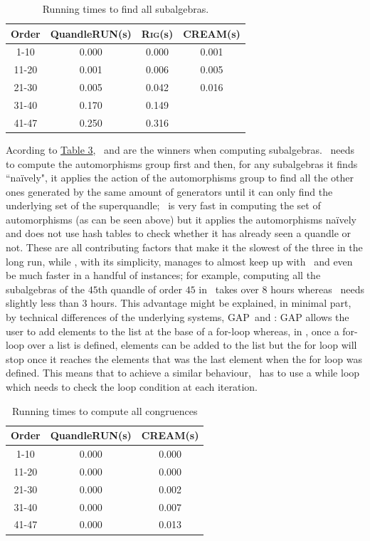 \documentclass{mcom-l}
\begin{document}
\begin{table}[H]
    \label{subTable}
    \centering
    \begin{tabular}{|c|c|c|c|}
        \hline
         Order & \textsf{QuandleRUN}(s) & \textsc{Rig}(s) & \textsc{CREAM}(s) \\ \hline
         1-10 & 0.000 & 0.000 & 0.001 \\ \hline
         11-20 & 0.001 & 0.006 & 0.005 \\ \hline
         21-30 & 0.005 & 0.042 & 0.016 \\ \hline%
         31-40 & 0.170 & 0.149 &   \\ \hline
         41-47 & 0.250& 0.316&    \\ \hline
    \end{tabular}
    \caption{Running times to find all subalgebras.}
\end{table}
 \noindent Acording to \hyperref[subTable]{Table 3}, \Software~and \rig are the winners when computing subalgebras. \cream~needs to compute the automorphisms group first and then, for any subalgebras it finds ``naïvely", it applies the action of the automorphisms group to find all the other ones generated by the same amount of generators until it can only find the underlying set of the superquandle; \cream~is very fast in computing the set of automorphisms (as can be seen above) but it applies the automorphisms naïvely and does not use hash tables to check whether it has already seen a quandle or not. These are all contributing factors that make it the slowest of the three in the long run, while \rig, with its simplicity, manages to almost keep up with \Software~and even be much faster in a handful of instances; for example, computing all the subalgebras of the $45$th quandle of order $45$ in \Software~takes over $8$ hours whereas \rig~needs slightly less than 3 hours. This advantage might be explained, in minimal part, by technical differences of the underlying systems, \textsc{GAP}~and \magma: \textsc{GAP} allows the user to add elements to the list at the base of a for-loop whereas, in \magma, once a for-loop over a list is defined, elements can be added to the list but the for loop will stop once it reaches the elements that was the last element when the for loop was defined. This means that to achieve a similar behaviour, \Software~has to use a while loop which needs to check the loop condition at each iteration.
\begin{table}[H]
    \centering
    \begin{tabular}{|c|c|c|}
        \hline
         Order & \textsf{QuandleRUN}(s) & \textsc{CREAM}(s) \\ \hline
          1-10 & 0.000 & 0.000 \\ \hline
         11-20 & 0.000 & 0.000 \\ \hline
         21-30 & 0.000 & 0.002\\ \hline
         31-40 & 0.000 & 0.007\\ \hline
         41-47 & 0.000 & 0.013 \\ \hline
    \end{tabular}
    \caption{Running times to compute all congruences}
    
\end{table}
\end{document}
